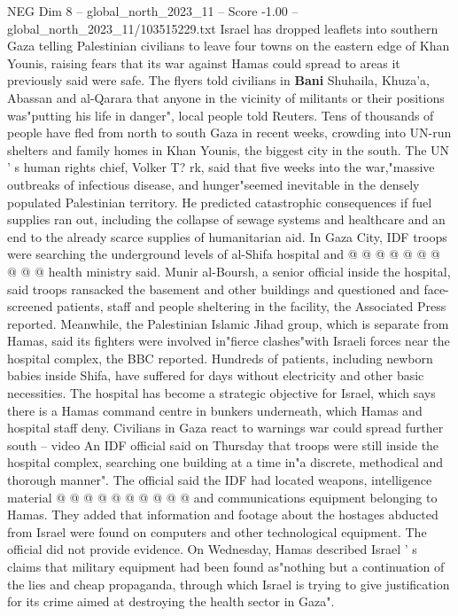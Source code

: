 \begin{textsample}{NEG Dim 8 – global\_north\_2023\_11 – Score -1.00 – global\_north\_2023\_11/103515229.txt}  \label{ex:f8_neg_335}
Israel has dropped leaflets into southern Gaza telling Palestinian civilians to leave four towns on the eastern edge of Khan Younis, raising fears that its war against Hamas could spread to areas it previously said were safe.
The flyers told civilians in \textbf{Bani} Shuhaila, Khuza'a, Abassan and al-Qarara that anyone in the vicinity of militants or their positions was"putting his life in danger", local people told Reuters.
Tens of thousands of people have fled from north to south Gaza in recent weeks, crowding into UN-run shelters and family homes in Khan Younis, the biggest city in the south.
The UN ' s human rights chief, Volker T? rk, said that five weeks into the war,"massive outbreaks of infectious disease, and hunger"seemed inevitable in the densely populated Palestinian territory.
He predicted catastrophic consequences if fuel supplies ran out, including the collapse of sewage systems and healthcare and an end to the already scarce supplies of humanitarian aid.
In Gaza City, IDF troops were searching the underground levels of al-Shifa hospital and @ @ @ @ @ @ @ @ @ @ health ministry said.
Munir al-Boursh, a senior official inside the hospital, said troops ransacked the basement and other buildings and questioned and face-screened patients, staff and people sheltering in the facility, the Associated Press reported.
Meanwhile, the Palestinian Islamic Jihad group, which is separate from Hamas, said its fighters were involved in"fierce clashes"with Israeli forces near the hospital complex, the BBC reported.
Hundreds of patients, including newborn babies inside Shifa, have suffered for days without electricity and other basic necessities.
The hospital has become a strategic objective for Israel, which says there is a Hamas command centre in bunkers underneath, which Hamas and hospital staff deny.
Civilians in Gaza react to warnings war could spread further south -- video An IDF official said on Thursday that troops were still inside the hospital complex, searching one building at a time in"a discrete, methodical and thorough manner".
The official said the IDF had located weapons, intelligence material @ @ @ @ @ @ @ @ @ @ and communications equipment belonging to Hamas.
They added that information and footage about the hostages abducted from Israel were found on computers and other technological equipment.
The official did not provide evidence.
On Wednesday, Hamas described Israel ' s claims that military equipment had been found as"nothing but a continuation of the lies and cheap propaganda, through which Israel is trying to give justification for its crime aimed at destroying the health sector in Gaza".

\end{textsample}
